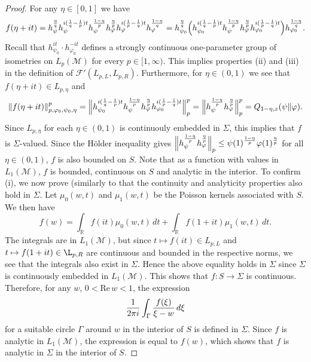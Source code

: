 \documentclass[12pt]{article}
\theoremstyle{definition}
\theoremstyle{remark}
\numberwithin{equation}{section}
\def\Me{\mathcal M}
\def\cF{\mathcal{F}}
\def\ffi{\varphi}
\def\bR{\mathbb{R}}
\def\Re{\mathrm{Re}\,}
\begin{document}
\begin{proof}
For any $\eta\in[0,1]$ we have
\[
f(\eta+it)=h_\psi^{\eta\over q}h_\psi^{i({1\over q}-{1\over p})t}h_\psi^{1-\eta\over p}
h_\ffi^{\eta\over p}h_\ffi^{i({1\over p}-{1\over q})t}h_\ffi^{1-\eta\over q}
=h_{\psi_0}^{\eta\over q}\Bigl(h_{\psi_0}^{i({1\over q}-{1\over p})t}h_\psi^{1-\eta\over p}
h_\ffi^{\eta\over p}h_{\ffi_0}^{i({1\over p}-{1\over q})t}\Bigr)h_{\ffi_0}^{1-\eta\over q}.
\]
Recall \cite[Lemmas 10.1 and 10.2]{kosaki1984applications} that $h_{\psi_0}^{it}\cdot h_{\ffi_0}^{-it}$
defines a strongly continuous one-parameter group of isometries on $L_p(\Me)$ for every $p\in[1,\infty)$.
This implies properties (ii) and (iii) in the definition of $\cF'(L_{p,L},L_{p,R})$. Furthermore, for $\eta\in(0,1)$
we see that $f(\eta+it)\in L_{p,\eta}$ and
\[
\|f(\eta+it)\|_{p,\ffi_0,\psi_0,\eta}^p
=\Big\|h_{\psi_0}^{i({1\over q}-{1\over p})t}h_\psi^{1-\eta\over p}
h_\ffi^{\eta\over p}h_{\ffi_0}^{i({1\over p}-{1\over q})t}\Big\|_p^p
=\Big\|h_\psi^{1-\eta\over p}h_\ffi^{\eta\over p}\Big\|_p^p=Q_{1-\eta,z}(\psi\|\ffi).
\]
Since $L_{p,\eta}$ for each $\eta\in(0,1)$ is continuouly embedded in $\Sigma$, this implies that $f$ is
$\Sigma$-valued. Since the H\"older inequality gives
$\Big\|h_\psi^{1-\eta\over p}h_\ffi^{\eta\over p}\Big\|_p\le\psi(1)^{1-\eta\over p}\ffi(1)^{\eta\over p}$ for all
$\eta\in(0,1)$, $f$ is also bounded on $S$. Note that as a function with values in $L_1(\Me)$, $f$ is bounded,
continuous on $S$ and analytic in the interior. To confirm (i), we now prove (similarly to
\cite[Secs.~9.1 and 29.1]{calderon1964intermediate} that the continuity and analyticity properties also hold
in $\Sigma$. Let $\mu_0(w,t)$ and $\mu_1(w,t)$ be the Poisson kernels associated with $S$. We then have
\[
f(w)=\int_\bR f(it)\mu_0(w,t)\,dt+\int_\bR f(1+it)\mu_1(w,t)\,dt.
\]
The integrals are in $L_1(\Me)$, but since $t\mapsto f(it)\in L_{p,L}$ and $t\mapsto f(1+it)\in\L_{p,R}$ are
continuous and bounded in the respective norms, we see that the integrals also exist in $\Sigma$. Hence
the above equality holds in $\Sigma$ since $\Sigma$ is continuously embedded in $L_1(\Me)$. This shows
that $f:S\to\Sigma$ is continuous. Therefore, for any $w$, $0<\Re w<1$, the expression
\[
{1\over2\pi i}\int_\Gamma{f(\xi)\over\xi-w}\,d\xi
\]
for a suitable circle $\Gamma$ around $w$ in the interior of $S$ is defined in $\Sigma$. Since $f$ is
analytic in $L_1(\Me)$, the expression is equal to $f(w)$, which shows that $f$ is analytic in $\Sigma$ in
the interior of $S$.
\end{proof}
\end{document}
